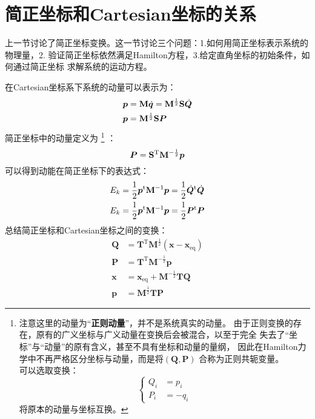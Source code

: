     \section{简正坐标和Cartesian坐标的关系}
    上一节讨论了简正坐标变换。这一节讨论三个问题：1.如何用简正坐标表示系统的物理量，2.
    验证简正坐标依然满足Hamilton方程，3.给定直角坐标的初始条件，如何通过简正坐标
    求解系统的运动方程。

    \splitline

    在Cartesian坐标系下系统的动量可以表示为：
    \begin{equation}
        \begin{split}
        \bm{p} &= \mathbf{M}\dot{\bm{q}} = \mathbf{M}^{\frac 12} \mathbf{S}\dot{\bm{Q}}\\
        \bm{p} &= \mathbf{M}^{\frac{1}{2}}\mathbf{S}\bm{P}
        \end{split}
    \end{equation}
    简正坐标中的动量定义为
    \footnote{
        注意这里的动量为“\textbf{正则动量}”，并不是系统真实的动量。
        由于正则变换的存在，原有的广义坐标与广义动量在变换后会被混合，以至于完全
        失去了“坐标”与“动量”的原有含义，甚至不具有坐标和动量的量纲，
        因此在Hamilton力学中不再严格区分坐标与动量，而是将$(\bm{Q}, \bm{P})$
        合称为正则共轭变量。\\
        可以选取变换：
        \begin{equation}
            \left\{
                \begin{split}
                    Q_{i} &= p_i\\
                    P_{i} &= -q_i
                \end{split}
            \right.
        \end{equation}
        将原本的动量与坐标互换。
    }
    ：
    \begin{equation}
        \bm{P} = \mathbf{S}^{\mathrm{T}} \mathbf{M}^{-\frac 12} \bm{p}
    \end{equation}
    可以得到动能在简正坐标下的表达式：
    \begin{equation}
        \begin{split}
        E_{k} &= \frac{1}{2}\bm{p}^{\mathrm{t}}\mathbf{M}^{-1}\bm{p} = \frac{1}{2}\dot{\bm{Q}}^{\mathrm{t}}\dot{\bm{Q}}\\
        E_{k} &= \frac{1}{2}\bm{p}^{\mathrm{t}}\mathbf{M}^{-1}\bm{p} = \frac{1}{2}\bm{P}^{\mathrm{t}}\bm{P}
        \end{split}
    \end{equation}
    总结简正坐标和Cartesian坐标之间的变换：
    \begin{equation}
        \begin{aligned}
        \bm{Q} &= \bm{T}^\mathrm{T} \bm{M}^{\frac 12} (\bm{x-x}_\mathrm{eq})\\
        \bm{P} &= \bm{T}^\mathrm{T} \bm{M}^{-\frac 12} \bm{p}\\
        \bm{x} &= \bm{x}_\mathrm{eq} + \bm{M}^{-\frac 12}\bm{TQ}\\
        \bm{p} &= \bm{M}^{\frac 12}\bm{TP}
        \end{aligned}
        \label{normal mode and cartesian coordinate}
    \end{equation}

